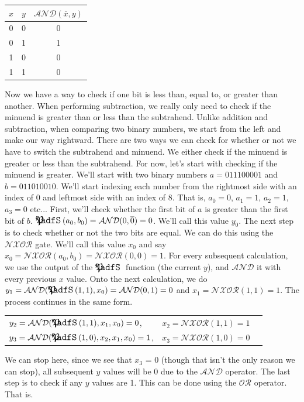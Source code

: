 \documentclass[oneside]{book}
\begin{document}
\begin{center}
\begin{tabular}{|c|c|c|}
\hline
$x$ & $y$ & $\mathcal{AND}(\overline{x},y)$ \\
\hline
0 & 0 & 0 \\
0 & 1 & 1 \\
1 & 0 & 0 \\
1 & 1 & 0 \\
\hline
\end{tabular}
\end{center}
\tab
Now we have a way to check if one bit is less than, equal to, or greater than another. When performing subtraction, we really only need to check if the minuend is greater than or less than the subtrahend. Unlike addition and subtraction, when comparing two binary numbers, we start from the left and make our way rightward. There are two ways we can check for whether or not we have to switch the subtrahend and minuend. We either check if the minuend is greater or less than the subtrahend. For now, let's start with checking if the minuend is greater.
\newline
\tab
We'll start with two binary numbers $a=011100001$ and $b=011010010$. We'll start indexing each number from the rightmost side with an index of 0 and leftmost side with an index of 8. That is, $a_0=0$, $a_1=1$, $a_2=1$, $a_3=0$ etc... First, we'll check whether the first bit of $a$ is greater than the first bit of $b$. $\GreaterThan(a_0, b_0)=\mathcal{AND}(0,\overline{0})=0$. We'll call this value $y_0$. The next step is to check whether or not the two bits are equal. We can do this using the $\mathcal{NXOR}$ gate. We'll call this value $x_0$ and say $x_0=\mathcal{NXOR}(a_0,b_0)=\mathcal{NXOR}(0,0)=1$. For every subsequent calculation, we use the output of the $\GreaterThan$ function (the current $y$), and $\mathcal{AND}$ it with every previous $x$ value.
\newline
\tab
Onto the next calculation, we do $y_1=\mathcal{AND}(\GreaterThan(1,1),x_0)=\mathcal{AND}(0,1)=0$ and $x_1=\mathcal{NXOR}(1,1)=1$. The process continues in the same form.
\begin{center}
\begin{tabular}{l c c}
$y_2 = \mathcal{AND}(\GreaterThan(1,1),x_1,x_0) = 0$, & $x_2 = \mathcal{NXOR}(1,1)=1$ \\
$y_3 = \mathcal{AND}(\GreaterThan(1,0),x_2,x_1,x_0) = 1$, & $x_3 = \mathcal{NXOR}(1,0)=0$
\end{tabular}
\end{center}
\tab
We can stop here, since we see that $x_3$ = 0 (though that isn't the only reason we can stop), all subsequent $y$ values will be 0 due to the $\mathcal{AND}$ operator. The last step is to check if any $y$ values are 1. This can be done using the $\mathcal{OR}$ operator. That is.
\end{document}
